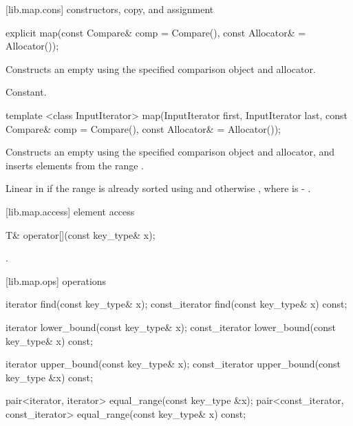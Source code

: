 [lib.map.cons]{ constructors, copy, and assignment}%
%

%
%
\begin{itemdecl}
explicit map(const Compare& comp = Compare(),
             const Allocator& = Allocator());
\end{itemdecl}

\begin{itemdescr}
\pnum
\effects
Constructs an empty
using the specified comparison object and allocator.

\pnum
\complexity
Constant.
\end{itemdescr}

%
\begin{itemdecl}
template <class InputIterator>
  map(InputIterator first, InputIterator last,
      const Compare& comp = Compare(), const Allocator& = Allocator());
\end{itemdecl}

\begin{itemdescr}
\pnum
\effects
Constructs an empty
using the specified comparison object and allocator,
and inserts elements from the range
.

\pnum
\complexity
Linear in  if the range
is already sorted using 
and otherwise , where 
is  - .
\end{itemdescr}

[lib.map.access]{ element access}

%
\begin{itemdecl}
T& operator[](const key_type& x);
\end{itemdecl}

\begin{itemdescr}
\pnum
\returns
{}.
\end{itemdescr}

[lib.map.ops]{ operations}

%
%
\begin{itemdecl}
iterator       find(const key_type& x);
const_iterator find(const key_type& x) const;

iterator       lower_bound(const key_type& x);
const_iterator lower_bound(const key_type& x) const;

iterator       upper_bound(const key_type& x);
const_iterator upper_bound(const key_type &x) const;

pair<iterator, iterator>
  equal_range(const key_type &x);
pair<const_iterator, const_iterator>
  equal_range(const key_type& x) const;
\end{itemdecl}

